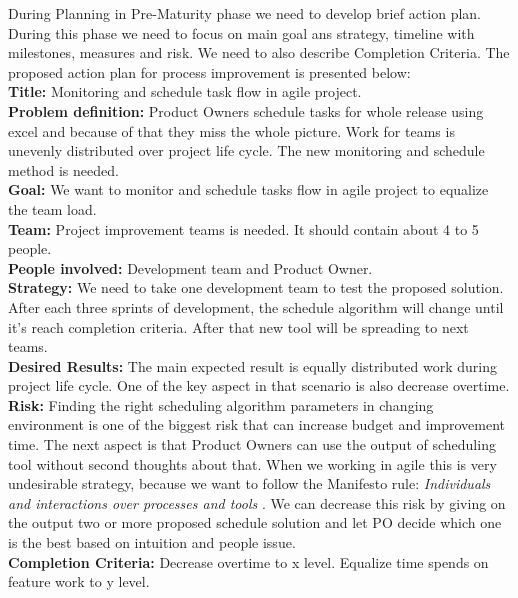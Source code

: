 During Planning in Pre-Maturity phase we need to develop brief action plan. During this phase we need to focus on main goal ans strategy, timeline with milestones, measures and risk. We need to also describe Completion Criteria. The proposed action plan for process improvement is presented below: \\
\textbf{Title:}  Monitoring and schedule task flow in agile project.\\
\textbf{Problem definition:} Product Owners schedule tasks for whole release using excel and because of that they miss the whole picture. Work for teams is unevenly distributed over project life cycle. The new monitoring and schedule method is needed.\\
\textbf{Goal:}  We want to monitor and schedule tasks flow in agile project to equalize the team load.\\
\textbf{Team:} Project improvement teams is needed. It should contain about 4 to 5 people.\\
\textbf{People involved:} Development team and Product Owner.\\
\textbf{Strategy:} We need to take one development team to test the proposed solution. After each three sprints of development, the schedule algorithm will change until it's reach completion criteria. After that new tool will be spreading to next teams.\\
\textbf{Desired Results:} The main expected result is equally distributed work during project life cycle. One of the key aspect in that scenario is also decrease overtime.\\
\textbf{Risk:} Finding the right scheduling algorithm parameters in changing environment is one of the biggest risk that can increase budget and improvement time. The next aspect is that Product Owners can use the output of scheduling tool without second thoughts about that. When we working in agile this is very undesirable strategy, because we want to follow the Manifesto rule: \textit{Individuals and interactions over processes and tools} \cite{manifesto}. We can decrease this risk by giving on the output two or more proposed schedule solution and let PO decide which one is the best based on intuition and people issue. \\
\textbf{Completion Criteria:} Decrease overtime to x level. Equalize  time spends on feature work to y level.


